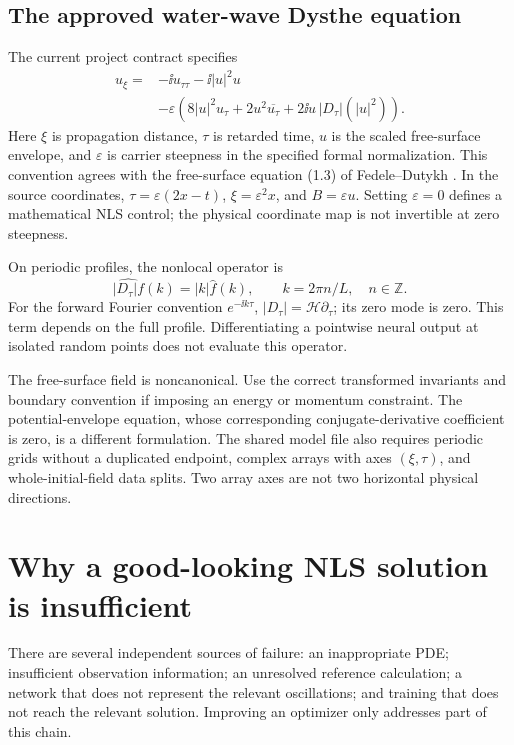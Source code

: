\subsection{The approved water-wave Dysthe equation}
The current project contract specifies
\begin{equation}
\begin{split}
 u_\xi={}&-\ii u_{\tau\tau}-\ii|u|^2u\\
 &-\varepsilon\left(8|u|^2u_\tau
       +2u^2\overline{u_\tau}
       +2\ii u\,|D_\tau|(|u|^2)\right).
\end{split}
\label{eq:dysthe}
\end{equation}
Here $\xi$ is propagation distance, $\tau$ is retarded time, $u$ is the
scaled free-surface envelope, and $\varepsilon$ is carrier steepness in the
specified formal normalization. This convention agrees with the
free-surface equation (1.3) of Fedele--Dutykh \cite{fedele}. In the source
coordinates, $\tau=\varepsilon(2x-t)$, $\xi=\varepsilon^2x$, and
$B=\varepsilon u$. Setting $\varepsilon=0$ defines a mathematical NLS
control; the physical coordinate map is not invertible at zero steepness.

On periodic profiles, the nonlocal operator is
\[
 \widehat{|D_\tau|f}(k)=|k|\widehat f(k),
 \qquad k=2\pi n/L,\quad n\in\mathbb Z.
\]
For the forward Fourier convention $e^{-\ii k\tau}$,
$|D_\tau|=\mathcal H\partial_\tau$; its zero mode is zero. This term
depends on the full profile. Differentiating a pointwise neural output at
isolated random points does not evaluate this operator.

The free-surface field is noncanonical. Use the correct transformed
invariants and boundary convention if imposing an energy or momentum
constraint. The potential-envelope equation, whose corresponding
conjugate-derivative coefficient is zero, is a different formulation.
The shared model file also requires periodic grids without a duplicated
endpoint, complex arrays with axes $(\xi,\tau)$, and whole-initial-field
data splits. Two array axes are not two horizontal physical directions.

\section{Why a good-looking NLS solution is insufficient}
\label{sec:failure}
There are several independent sources of failure: an inappropriate PDE;
insufficient observation information; an unresolved reference calculation;
a network that does not represent the relevant oscillations; and training
that does not reach the relevant solution. Improving an optimizer only
addresses part of this chain.

